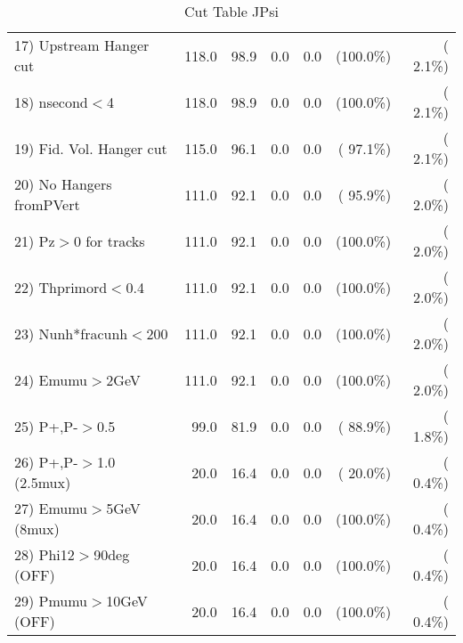 \begin{table}[h!]
\begin{tabular}{||l||r|r|r|r|r|r||}
 17) Upstream Hanger cut  &        118.0 &         98.9 &          0.0 &          0.0 & (100.0\%) & (  2.1\%) \\
 18) nsecond$<$4          &        118.0 &         98.9 &          0.0 &          0.0 & (100.0\%) & (  2.1\%) \\
 19) Fid. Vol. Hanger cut &        115.0 &         96.1 &          0.0 &          0.0 & ( 97.1\%) & (  2.1\%) \\
 20) No Hangers fromPVert &        111.0 &         92.1 &          0.0 &          0.0 & ( 95.9\%) & (  2.0\%) \\
 21) Pz$>$0 for tracks    &        111.0 &         92.1 &          0.0 &          0.0 & (100.0\%) & (  2.0\%) \\
 22) Thprimord$<$0.4      &        111.0 &         92.1 &          0.0 &          0.0 & (100.0\%) & (  2.0\%) \\
 23) Nunh*fracunh$<$200   &        111.0 &         92.1 &          0.0 &          0.0 & (100.0\%) & (  2.0\%) \\
 24) Emumu$>$2GeV         &        111.0 &         92.1 &          0.0 &          0.0 & (100.0\%) & (  2.0\%) \\
 25) P+,P-$>$0.5          &         99.0 &         81.9 &          0.0 &          0.0 & ( 88.9\%) & (  1.8\%) \\
 26) P+,P-$>$1.0 (2.5mux) &         20.0 &         16.4 &          0.0 &          0.0 & ( 20.0\%) & (  0.4\%) \\
 27) Emumu$>$5GeV  (8mux) &         20.0 &         16.4 &          0.0 &          0.0 & (100.0\%) & (  0.4\%) \\
 28) Phi12$>$90deg  (OFF) &         20.0 &         16.4 &          0.0 &          0.0 & (100.0\%) & (  0.4\%) \\
 29) Pmumu$>$10GeV  (OFF) &         20.0 &         16.4 &          0.0 &          0.0 & (100.0\%) & (  0.4\%) \\
 \hline
 \hline
 \end{tabular}
 \caption{Cut Table  JPsi     }
 \label{tab-cutcohjpsi-mumu_jpsi}
 \end{table}

